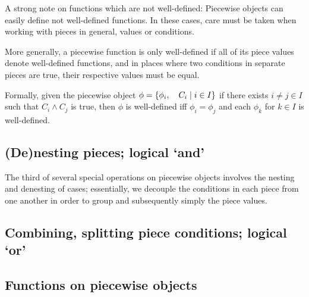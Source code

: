 \begin{theorem}
    A strong note on functions which are not well-defined: Piecewise objects can easily define not well-defined functions. In these cases, care must be taken when working with pieces in general, values or conditions. 

    More generally, a piecewise function is only well-defined if all of its piece values denote well-defined functions, and in places where two conditions in separate pieces are true, their respective values must be equal.

    Formally, given the piecewise object $\phi=\{\phi_i,\quad C_i\mid i\in I\}$ if there exists $i\neq j\in I$ such that $C_i\land C_j$ is true, then $\phi$ is well-defined iff $\phi_i=\phi_j$ and each $\phi_k$ for $k\in I$ is well-defined.
\end{theorem}

\subsection{(De)nesting pieces; logical `and'}
The third of several special operations on piecewise objects involves the nesting and denesting of cases; essentially, we decouple the conditions in each piece from one another in order to group and subsequently simply the piece values.
\subsection{Combining, splitting piece conditions; logical `or'}
\subsection{Functions on piecewise objects}
\newpage{}